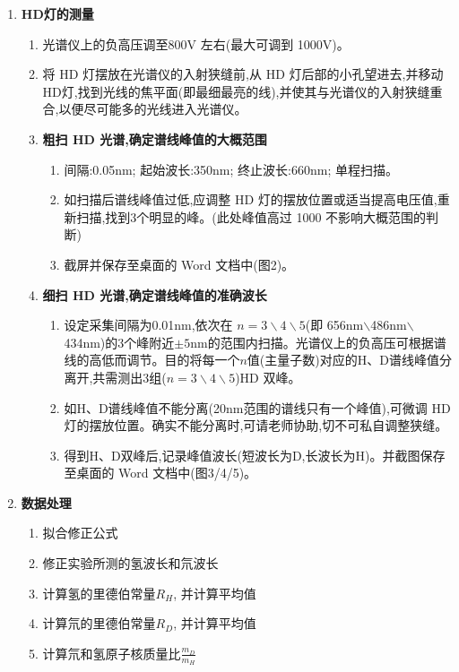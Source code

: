 \documentclass[12pt,a4paper]{article}
\begin{document}
\begin{enumerate}
		\item \textbf{HD灯的测量}
		\begin{enumerate}
			\item 光谱仪上的负高压调至800V 左右(最大可调到 1000V)。
			\item 将 HD 灯摆放在光谱仪的入射狭缝前,从 HD 灯后部的小孔望进去,并移动HD灯,找到光线的焦平面(即最细最亮的线),并使其与光谱仪的入射狭缝重合,以便尽可能多的光线进入光谱仪。
			\item \textbf{粗扫 HD 光谱,确定谱线峰值的大概范围}
			\begin{enumerate}
				\item 间隔:0.05nm; 起始波长:350nm; 终止波长:660nm; 单程扫描。
				\item 如扫描后谱线峰值过低,应调整 HD 灯的摆放位置或适当提高电压值,重新扫描,找到3个明显的峰。(此处峰值高过 1000 不影响大概范围的判断)
				\item 截屏并保存至桌面的 Word 文档中(图2)。
			\end{enumerate}
			\item \textbf{细扫 HD 光谱,确定谱线峰值的准确波长}
			\begin{enumerate}
				\item 设定采集间隔为0.01nm,依次在 $n=3\backslash 4\backslash 5$(即 656nm$\backslash$486nm$\backslash$434nm)的3个峰附近$\pm 5$nm的范围内扫描。光谱仪上的负高压可根据谱线的高低而调节。目的将每一个$n$值(主量子数)对应的H、D谱线峰值分离开,共需测出3组($n=3\backslash 4\backslash 5$)HD 双峰。
				\item 如H、D谱线峰值不能分离(20nm范围的谱线只有一个峰值),可微调 HD灯的摆放位置。确实不能分离时,可请老师协助,切不可私自调整狭缝。
				\item 得到H、D双峰后,记录峰值波长(短波长为D,长波长为H)。并截图保存至桌面的 Word 文档中(图3/4/5)。
			\end{enumerate}
		\end{enumerate}

		\item \textbf{数据处理} %
		\begin{enumerate} %
			\item 拟合修正公式
			\item 修正实验所测的氢波长和氘波长
			\item 计算氢的里德伯常量$R_H$, 并计算平均值
			\item 计算氘的里德伯常量$R_D$, 并计算平均值
			\item 计算氘和氢原子核质量比$\frac{m_D}{m_H}$
		\end{enumerate}

	\end{enumerate}
	
\end{document}
